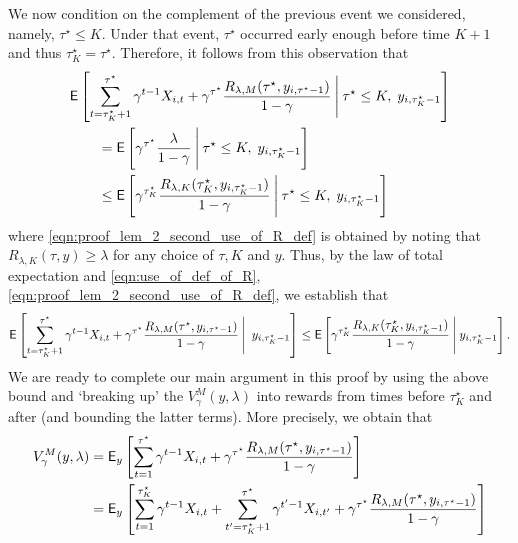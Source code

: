 \begin{myproof}[Proof.]
	We now condition on the complement of the previous event we considered, namely, $\tau^\star \le K$. Under that event, $\tau^\star$ occurred early enough before time $K+1$ and thus $\tau^\star_K = \tau^\star$. Therefore, it follows from this observation that
	\begin{align} 
	&\E\left[\sum_{t=\tau_K^\star+1}^{\tau^\star}\gamma^{t-1} X_{i,t} + \gamma^{\tau^\star} \frac{R_{\lambda,M}(\tau^\star, y_{i,\tau^\star-1})}{1-\gamma}
	\given[\Bigg] \tau^\star \le K, \;y_{i,\tau^\star_K-1} \right] \nonumber  \\
	&\qquad = \E\left[\gamma^{\tau^\star}  \frac{\lambda}{1-\gamma}
	\given[\Bigg]\tau^\star \le K, \; y_{i,\tau^\star_K-1} \right] \nonumber \\
	&\qquad \le \E\left[\gamma^{\tau^\star_K}  \frac{R_{\lambda,K}(\tau^\star_K, y_{i,\tau^\star_K-1})}{1-\gamma}
	\given[\Bigg]\tau^\star \le K, \; y_{i,\tau^\star_K-1} \right] \label{eqn:proof_lem_2_second_use_of_R_def}
	\end{align}
	where \eqref{eqn:proof_lem_2_second_use_of_R_def} is obtained by noting that $R_{\lambda,K}(\tau, y) \ge \lambda$ for any choice of $\tau, K$ and $y$. Thus, by the law of total expectation and \eqref{eqn:use_of_def_of_R}, \eqref{eqn:proof_lem_2_second_use_of_R_def}, we establish that
	\begin{equation} \label{ineq:proof_lem_2_main_bound_in_proof}
	\E\left[\sum_{t=\tau_K^\star+1}^{\tau^\star}\gamma^{t-1} X_{i,t} + \gamma^{\tau^\star} \frac{R_{\lambda,M}(\tau^\star, y_{i,\tau^\star-1})}{1-\gamma}
	\given[\Bigg] \;y_{i,\tau^\star_K-1} \right] \le \Ee{\gamma^{\tau^\star_K}  \frac{R_{\lambda,K}(\tau^\star_K, y_{i,\tau^\star_K-1})}{1-\gamma} \given[\Bigg] y_{i,\tau^\star_K-1}}.
	\end{equation}
	We are ready to complete our main argument in this proof by using the above bound and `breaking up' the $V_\gamma^M(y, \lambda)$ into rewards from times before $\tau_K^\star$ and after (and bounding the latter terms). More precisely, we obtain that
	\begin{align}
	V_\gamma^M(y,\lambda) & = \E_{y}\left[\sum_{t=1}^{\tau^\star}\gamma^{t-1} X_{i,t} + \gamma^{\tau^\star}\frac{R_{\lambda,M}(\tau^\star, y_{i,\tau^\star-1})}{1-\gamma}\right] \\
	& = \E_{y}\left[\sum_{t=1}^{\tau^\star_K}\gamma^{t-1} X_{i,t} + \sum_{t'=\tau^\star_K+1}^{\tau^\star}\gamma^{t'-1} X_{i,t'} +  \gamma^{\tau^\star}\frac{R_{\lambda,M}(\tau^\star, y_{i,\tau^\star-1})}{1-\gamma}\right] \nonumber \\

\end{align}
\end{myproof}
